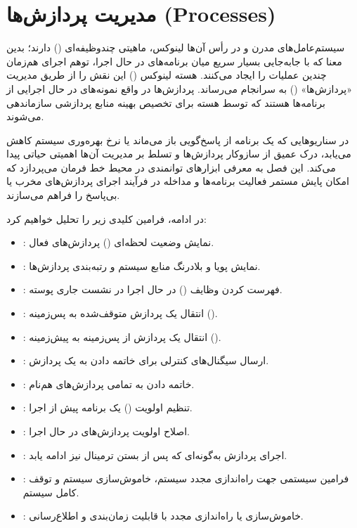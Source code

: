 \chapter{مدیریت پردازش‌ها (Processes)}

سیستم‌عامل‌های مدرن و در رأس آن‌ها لینوکس، ماهیتی چندوظیفه‌ای () دارند؛ بدین معنا که با ‌جابه‌جایی بسیار سریع میان برنامه‌های در حال اجرا، توهم اجرای هم‌زمان چندین عملیات را ایجاد می‌کنند. هسته لینوکس () این نقش را از طریق مدیریت «پردازش‌ها» () به سرانجام می‌رساند. پردازش‌ها در واقع نمونه‌های در حال اجرایی از برنامه‌ها هستند که توسط هسته برای تخصیص بهینه منابع پردازشی سازماندهی می‌شوند.

در سناریوهایی که یک برنامه از پاسخ‌گویی باز می‌ماند یا نرخ بهره‌وری سیستم کاهش می‌یابد، درک عمیق از سازوکار پردازش‌ها و تسلط بر مدیریت آن‌ها اهمیتی حیاتی پیدا می‌کند. این فصل به معرفی ابزارهای توانمندی در محیط خط فرمان می‌پردازد که امکان پایش مستمر فعالیت برنامه‌ها و مداخله در فرآیند اجرای پردازش‌های مخرب یا بی‌پاسخ را فراهم می‌سازند.

در ادامه، فرامین کلیدی زیر را تحلیل خواهیم کرد:

\begin{itemize}
  \item {}: نمایش وضعیت لحظه‌ای () پردازش‌های فعال.
  \item {}: نمایش پویا و بلادرنگ منابع سیستم و رتبه‌بندی پردازش‌ها.
  \item {}: فهرست کردن وظایف () در حال اجرا در نشست جاری پوسته.
  \item {}: انتقال یک پردازش متوقف‌شده به پس‌زمینه ().
  \item {}: انتقال یک پردازش از پس‌زمینه به پیش‌زمینه ().
  \item {}: ارسال سیگنال‌های کنترلی برای خاتمه دادن به یک پردازش.
  \item {}: خاتمه دادن به تمامی پردازش‌های هم‌نام.
  \item {}: تنظیم اولویت () یک برنامه پیش از اجرا.
  \item {}: اصلاح اولویت پردازش‌های در حال اجرا.
  \item {}: اجرای پردازش به‌گونه‌ای که پس از بستن ترمینال نیز ادامه یابد.
  \item {}: فرامین سیستمی جهت راه‌اندازی مجدد سیستم، خاموش‌سازی سیستم و توقف کامل سیستم.
  \item {}: خاموش‌سازی یا راه‌اندازی مجدد با قابلیت زمان‌بندی و اطلاع‌رسانی.
\end{itemize}

